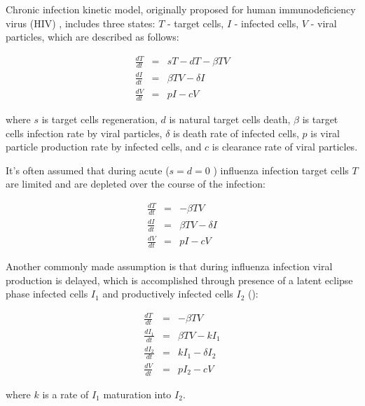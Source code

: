 Chronic infection kinetic model, originally proposed for human immunodeficiency virus (HIV) \cite{perelson2002modelling}, includes three states: $T$ - target cells, $I$ - infected cells, $V$ - viral particles, which are described as follows:

\begin{equation}
\begin{array}{rcl}
\frac{dT}{dt} &=& s T - d T - \beta T V \\
\frac{dI}{dt} &=& \beta T V - \delta I \\
\frac{dV}{dt} &=& p I - c V
\end{array}
\end{equation}

where $s$ is target cells regeneration, $d$ is natural target cells death, $\beta$ is target cells infection rate by viral particles, $\delta$ is death rate of infected cells, $p$ is viral particle production rate by infected cells, and $c$ is clearance rate of viral particles.

It's often assumed that during acute ($s = d = 0$ \cite{baccam2006kinetics}) influenza infection target cells $T$ are limited and are depleted over the course of the infection:

\begin{equation}
\begin{array}{rcl}
\frac{dT}{dt} &=& - \beta T V \\
\frac{dI}{dt} &=& \beta T V - \delta I \\
\frac{dV}{dt} &=& p I - c V
\end{array}
\end{equation}

Another commonly made assumption is that during influenza infection viral production is delayed, which is accomplished through presence of a latent eclipse phase infected cells $I_1$ and productively infected cells $I_2$ (\cite{baccam2006kinetics}):

\begin{equation}
\begin{array}{rcl}
\frac{dT}{dt} &=& - \beta T V \\
\frac{dI_1}{dt} &=& \beta T V - k I_1 \\
\frac{dI_2}{dt} &=& k I_1 - \delta I_2 \\
\frac{dV}{dt} &=& p I_2 - c V
\end{array}
\end{equation}

where $k$ is a rate of $I_1$ maturation into $I_2$.

